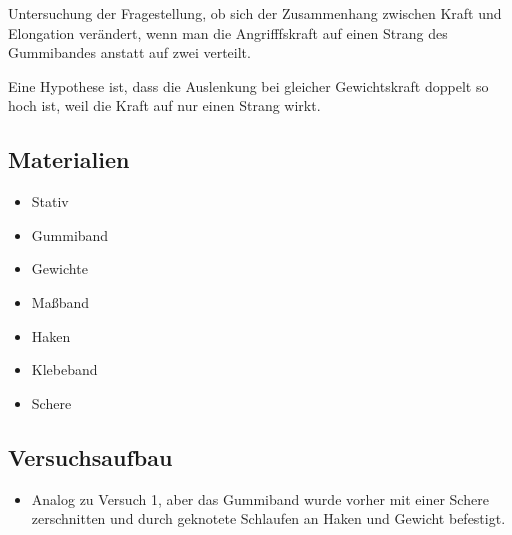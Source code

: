 \documentclass[
]{article}
\providecommand{\tightlist}{%
  \setlength{\itemsep}{0pt}\setlength{\parskip}{0pt}}
\begin{document}
Untersuchung der Fragestellung, ob sich der Zusammenhang zwischen Kraft
und Elongation verändert, wenn man die Angrifffskraft auf einen Strang
des Gummibandes anstatt auf zwei verteilt.

Eine Hypothese ist, dass die Auslenkung bei gleicher Gewichtskraft
doppelt so hoch ist, weil die Kraft auf nur einen Strang wirkt.

\hypertarget{materialien-1}{%
\subsection{Materialien}\label{materialien-1}}

\begin{itemize}
\tightlist
\item
  Stativ
\item
  Gummiband
\item
  Gewichte
\item
  Maßband
\item
  Haken
\item
  Klebeband
\item
  Schere
\end{itemize}

\hypertarget{versuchsaufbau-1}{%
\subsection{Versuchsaufbau}\label{versuchsaufbau-1}}

\begin{itemize}
\tightlist
\item
  Analog zu Versuch 1, aber das Gummiband wurde vorher mit einer Schere
  zerschnitten und durch geknotete Schlaufen an Haken und Gewicht
  befestigt.
\end{itemize}
\end{document}
